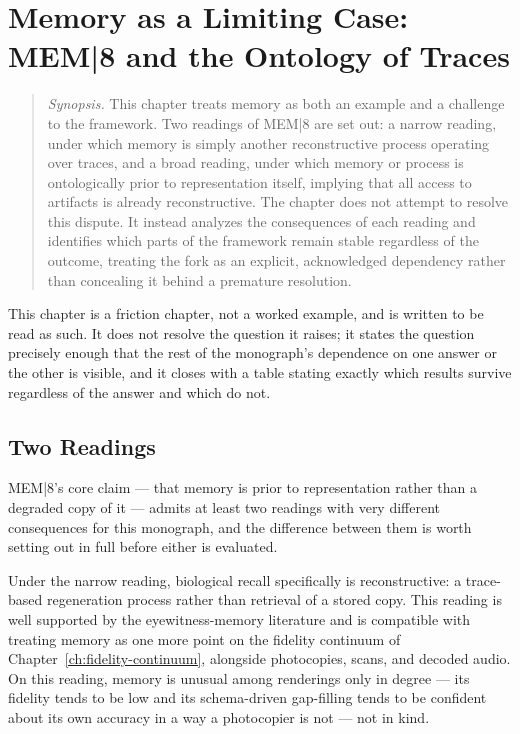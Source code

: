 \chapter{Memory as a Limiting Case: MEM|8 and the Ontology of Traces}
\label{ch:mem8}

\begin{quotation}
\noindent\textit{Synopsis.} This chapter treats memory as both an example
and a challenge to the framework. Two readings of MEM|8 are set out: a
narrow reading, under which memory is simply another reconstructive process
operating over traces, and a broad reading, under which memory or process
is ontologically prior to representation itself, implying that all access
to artifacts is already reconstructive. The chapter does not attempt to
resolve this dispute. It instead analyzes the consequences of each reading
and identifies which parts of the framework remain stable regardless of the
outcome, treating the fork as an explicit, acknowledged dependency rather
than concealing it behind a premature resolution.
\end{quotation}

This chapter is a friction chapter, not a worked example, and is written
to be read as such. It does not resolve the question it raises; it states
the question precisely enough that the rest of the monograph's dependence
on one answer or the other is visible, and it closes with a table stating
exactly which results survive regardless of the answer and which do not.

\section{Two Readings}

MEM|8's core claim --- that memory is prior to representation rather than
a degraded copy of it --- admits at least two readings with very
different consequences for this monograph, and the difference between
them is worth setting out in full before either is evaluated.

Under the narrow reading, biological recall specifically is
reconstructive: a trace-based regeneration process rather than retrieval
of a stored copy. This reading is well supported by the eyewitness-memory
literature and is compatible with treating memory as one more point on
the fidelity continuum of Chapter~\ref{ch:fidelity-continuum}, alongside
photocopies, scans, and decoded audio. On this reading, memory is unusual
among renderings only in degree --- its fidelity tends to be low and its
schema-driven gap-filling tends to be confident about its own accuracy in
a way a photocopier is not --- not in kind.


